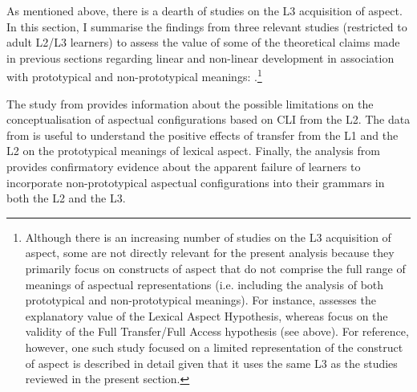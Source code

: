 \documentclass[output=paper,modfonts,nonflat,newtxmath]{langsci/langscibook}
\begin{document}
As mentioned above, there is a dearth of studies on the L3 acquisition of aspect. In this section, I summarise the findings from three relevant studies (restricted to adult L2/L3 learners) to assess the value of some of the theoretical claims made in previous sections regarding linear and non-linear development in association with prototypical and non-prototypical meanings: \citet{Salaberry2005, Foote2009, DiaubalickGuijarro-Fuentes2016}.\footnote{Although there is an increasing number of studies on the L3 acquisition of aspect, some are not directly relevant for the present analysis because they primarily focus on constructs of aspect that do not comprise the full range of meanings of aspectual representations (i.e. including the analysis of both prototypical and non-prototypical meanings). For instance, \citet{Fessi2013} assesses the explanatory value of the Lexical Aspect Hypothesis, whereas \citet{KarpavaEtAl2012} focus on the validity of the Full Transfer/Full Access hypothesis (see  above). For reference, however, one such study focused on a limited representation of the construct of aspect \citep{Foote2009} is described in detail given that it uses the same L3 as the studies reviewed in the present section.}

The study from \citeauthor{Salaberry2005} provides information about the possible limitations on the conceptualisation of aspectual configurations based on CLI from the L2. The data from \citeauthor{Foote2009} is useful to understand the positive effects of transfer from the L1 and the L2 on the prototypical meanings of lexical aspect. Finally, the analysis from \citeauthor{DiaubalickGuijarro-Fuentes2016} provides confirmatory evidence about the apparent failure of learners to incorporate non-prototypical aspectual configurations into their grammars in both the L2 and the L3.
\end{document}
